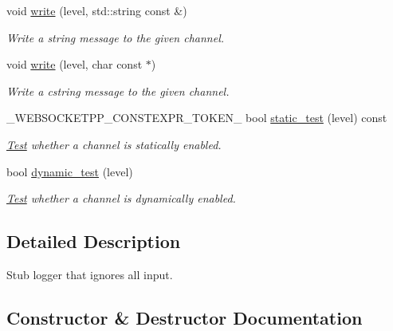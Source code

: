 \begin{DoxyCompactItemize}
void \mbox{\hyperlink{classwebsocketpp_1_1log_1_1stub_ae14dd42a83305f2dd9c03fc5018c88ee}{write}} (level, std\+::string const \&)
\begin{DoxyCompactList}\small\item\em Write a string message to the given channel. \end{DoxyCompactList}\item 
void \mbox{\hyperlink{classwebsocketpp_1_1log_1_1stub_a6c6844e088cfc64d9945348a52a86c73}{write}} (level, char const $\ast$)
\begin{DoxyCompactList}\small\item\em Write a cstring message to the given channel. \end{DoxyCompactList}\item 
\+\_\+\+W\+E\+B\+S\+O\+C\+K\+E\+T\+P\+P\+\_\+\+C\+O\+N\+S\+T\+E\+X\+P\+R\+\_\+\+T\+O\+K\+E\+N\+\_\+ bool \mbox{\hyperlink{classwebsocketpp_1_1log_1_1stub_a50ba8bfb0b2af7c494820a728eff0857}{static\+\_\+test}} (level) const
\begin{DoxyCompactList}\small\item\em \mbox{\hyperlink{struct_test}{Test}} whether a channel is statically enabled. \end{DoxyCompactList}\item 
bool \mbox{\hyperlink{classwebsocketpp_1_1log_1_1stub_ada729613ea1f62a71f47a4736978b096}{dynamic\+\_\+test}} (level)
\begin{DoxyCompactList}\small\item\em \mbox{\hyperlink{struct_test}{Test}} whether a channel is dynamically enabled. \end{DoxyCompactList}\end{DoxyCompactItemize}


\subsection{Detailed Description}
Stub logger that ignores all input. 

\subsection{Constructor \& Destructor Documentation}
\mbox{\label{classwebsocketpp_1_1log_1_1stub_ae28cf7e38cfb64008c4b5b3e90621ad9}} 
